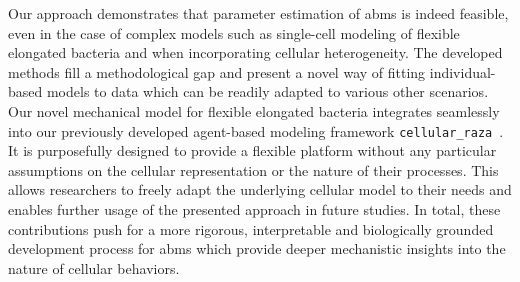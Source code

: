 \documentclass[10pt,letterpaper]{article}
\begin{document}
Our approach demonstrates that parameter estimation of \acp{abm} is indeed feasible, even in
the case of complex models such as single-cell modeling of flexible elongated bacteria and when
incorporating cellular heterogeneity.
The developed methods fill a methodological gap and present a novel way of fitting individual-based
models to data which can be readily adapted to various other scenarios.
Our novel mechanical model for flexible elongated bacteria integrates seamlessly into our previously
developed agent-based modeling framework \texttt{cellular\_raza}~\cite{Pleyer2025}.
It is purposefully designed to provide a flexible platform without any particular assumptions on the
cellular representation or the nature of their processes.
This allows researchers to freely adapt the underlying cellular model to their needs and enables
further usage of the presented approach in future studies.
In total, these contributions push for a more rigorous, interpretable and biologically grounded
development process for \acp{abm} which provide deeper mechanistic insights into the nature of
cellular behaviors.
\end{document}
